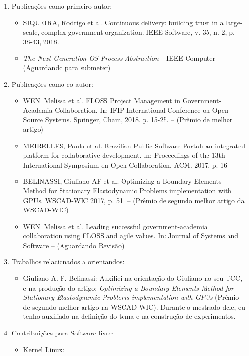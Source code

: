\begin{enumerate}
  \item Publicações como primeiro autor:
    \begin{itemize}
      \item
SIQUEIRA, Rodrigo et al. Continuous delivery: building trust in a large-scale, complex government organization. IEEE Software, v. 35, n. 2, p. 38-43, 2018.
      \item \emph{The Next-Generation OS Process Abstraction} -- IEEE Computer -- (Aguardando para submeter)
    \end{itemize}

  \item Publicações como co-autor:
    \begin{itemize}
			\item
WEN, Melissa et al. FLOSS Project Management in Government-Academia Collaboration. In: IFIP International Conference on Open Source Systems. Springer, Cham, 2018. p. 15-25. -- (Prêmio de melhor artigo)
      \item 
MEIRELLES, Paulo et al. Brazilian Public Software Portal: an integrated platform for collaborative development. In: Proceedings of the 13th International Symposium on Open Collaboration. ACM, 2017. p. 16.
      \item
BELINASSI, Giuliano AF et al. Optimizing a Boundary Elements Method for Stationary Elastodynamic Problems implementation with GPUs. WSCAD-WIC 2017, p. 51. -- (Prêmio de segundo melhor artigo da WSCAD-WIC)
      \item
WEN, Melissa et al. Leading successful government-academia collaboration using FLOSS and agile values. In: Journal of Systems and Software -- (Aguardando Revisão)
    \end{itemize}
  \item Trabalhos relacionados a orientandos:
    \begin{itemize}
      \item
Giuliano A. F. Belinassi: Auxiliei na orientação do Giuliano no seu TCC, e na
produção do artigo: \emph{Optimizing a Boundary Elements Method for Stationary
Elastodynamic Problems implementation with GPUs} (Prêmio de segundo melhor
artigo na WSCAD-WIC). Durante o mestrado dele, eu tenho auxiliado na definição
do tema e na construção de experimentos.
    \end{itemize}
  \item Contribuições para Software livre:
    \begin{itemize}
      \item Kernel Linux:

\end{itemize}
\end{enumerate}

